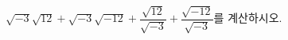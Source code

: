 $\sqrt{-3}\sqrt{12}+\sqrt{-3}\sqrt{-12}+\dfrac{\sqrt{12}}{\sqrt{-3}}+\dfrac{\sqrt{-12}}{\sqrt{-3}}$를 계산하시오.
